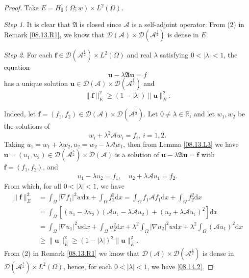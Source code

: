 \documentclass[preprint,12pt]{elsarticle}
\theoremstyle{definition}   %
\numberwithin{equation}{section}
\def\bs{\boldsymbol}
\def\mf{\mathfrak}
\def\Om{\Omega}
\def\la{\lambda}
\def\ts{\times}
\def\f{\frac}
\def\df{\mathrm d}
\def\mcA{\mathcal{A}}
\def\mcD{\mathcal{D}}
\newcommand{\R}{\mathbb R}
\begin{document}
\begin{proof}
	 Take $E=H_0^1(\Om;w)\ts L^2(\Om)$. 
	
	{\it Step 1}.  It is clear that $\mf{A}$ is closed since $\mcA$ is a self-adjoint operator. 
	From (2) in Remark \ref{08.13.R1}, we know that $\mcD(\mcA)\ts\mcD(\mcA^\f{1}{2})$ is dense in $E$. 
	
	{\it Step 2}. For each $\bs f\in \mcD(\mcA^\f{1}{2})\ts L^2(\Om)$ and real $\la$ satisfying $0<|\la|<1$, the equation 
	\begin{equation*}
		\bs u-\la \mf{A}\bs u=f
	\end{equation*}
	has a unique solution $\bs u\in \mcD(\mcA)\ts \mcD(\mcA^\f{1}{2})$ and 
	\begin{equation}\label{08.14.2}
		\|\bs f\|_E^2\geq (1-|\la|)\|\bs u\|_E^2. 
	\end{equation}
	
	Indeed, let $\bs{f}=(f_1,f_2)\in \mcD(\mcA)\ts \mcD(\mcA^\f{1}{2})$.  Let $0\neq \la\in \R$, and let $w_1,w_2$ be the solutions of 
	\begin{equation*}
		w_i+\la^2\mcA w_i=f_i, \ i=1,2. 
	\end{equation*}
	Taking $u_1=w_1+\la w_2, u_2=w_2-\la \mcA w_1$, then from Lemma \ref{08.13.L3} we have $\bs{u}=(u_1,u_2)\in \mcD(\mcA^{\f{3}{2}})\ts \mcD(\mcA)$ is a solution of $\bs{u}-\la \mf{A}\bs{u}=\bs{f}$ with $\bs{f}=(f_1,f_2)$, and 
	\begin{equation*}
		\begin{split}
			u_1-\la u_2=f_1, \quad u_2+\la \mcA u_1=f_2. 
		\end{split}
	\end{equation*}
	From which, for all $0<|\la|<1$,  we have 
	\begin{equation*}
		\begin{split}
			\|\bs{f}\|_E^2
			&=\int_\Om |\nabla f_1|^2w\df x+\int_\Om f_2^2\df x=\int_\Om f_1\mcA f_1\df x+\int_\Om f_2^2\df x\\
			&=\int_\Om \left[(u_1-\la u_2)(\mcA u_1-\la \mcA u_2)+(u_2+\la \mcA u_1)^2\right]\df x\\
			&=\int_\Om|\nabla u_1|^2w\df x+\int_\Om u_2^2\df x+\la^2\int_\Om |\nabla u_2|^2w\df x+\la^2\int_\Om \left(\mcA u_1\right)^2\df x\\
			&\geq \|\bs{u}\|_E^2\geq (1-|\la|)^2 \|\bs{u}\|_E^2. 
		\end{split}
	\end{equation*}
	From (2) in Remark \ref{08.13.R1} we know that $\mcD(\mcA)\ts \mcD(\mcA^{\f{1}{2}})$ is dense in $\mcD(\mcA^\f{1}{2})\ts L^2(\Om)$, hence, for each $0<|\la|<1$, we have  \eqref{08.14.2}. 
	

\end{proof}
\end{document}
